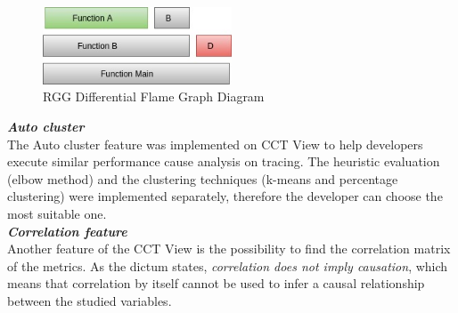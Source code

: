  \begin{figure}[h]
  \centering
    \includegraphics[width=0.5\textwidth]{figures/flame.jpg}
  \caption{RGG Differential Flame Graph Diagram}
  \label{fig:flame}
\end{figure}

\textbf{\textit{Auto cluster}}\\
The Auto cluster feature was implemented on CCT View to help developers execute similar performance cause analysis on tracing. The heuristic evaluation (elbow method) and the clustering techniques (k-means and percentage clustering) were implemented separately, therefore the developer can choose the most suitable one.\\
    
\textbf{\textit{Correlation feature}}\\
Another feature of the CCT View is the possibility to find the correlation matrix of the metrics. 
As the dictum states, \textit{correlation does not imply causation}, which means that correlation by itself cannot be used to infer a causal relationship between the studied variables.
    